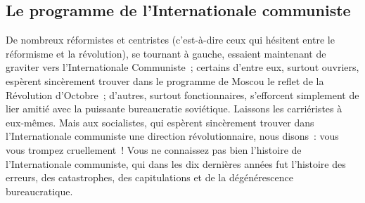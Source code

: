 \documentclass[french,twoside]{book} %
\begin{document}
\subsection[{Le programme de l’Internationale communiste}]{Le programme de l’Internationale communiste}
\noindent De nombreux réformistes et centristes (c’est-à-dire ceux qui hésitent entre le réformisme et la révolution), se tournant  à gauche, essaient maintenant de graviter vers l’Internationale Communiste ; certains d’entre eux, surtout ouvriers, espèrent sincèrement trouver dans le programme de Moscou le reflet de la Révolution d’Octobre ; d’autres, surtout fonctionnaires, s’efforcent simplement de lier amitié avec la puissante bureaucratie soviétique. Laissons les carriéristes à eux-mêmes. Mais aux socialistes, qui espèrent sincèrement trouver dans l’Internationale communiste une direction révolutionnaire, nous disons : vous vous trompez cruellement ! Vous ne connaissez pas bien l’histoire de l’Internationale communiste, qui dans les dix dernières années fut l’histoire des erreurs, des catastrophes, des capitulations et de la dégénérescence bureaucratique.\par
\end{document}
